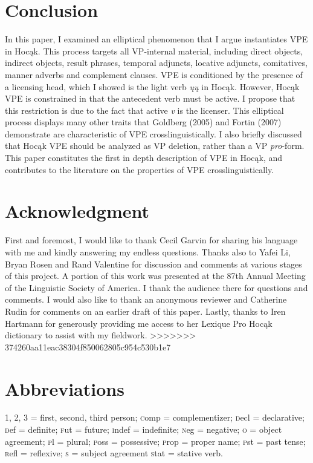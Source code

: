 \documentclass[output=paper]{LSP/langsci}
\begin{document}
\section{Conclusion}

In this paper, I examined an elliptical phenomenon that I argue instantiates VPE in Hoc\k{a}k. This process targets all VP-internal material, including direct objects, indirect objects, result phrases, temporal adjuncts, locative adjuncts, comitatives, manner adverbs and complement clauses. VPE is conditioned by the presence of a licensing head, which I showed is the light verb \emph{\k{u}\k{u}} in Hoc\k{a}k. However, Hoc\k{a}k VPE is constrained in that the antecedent verb must be active. I propose that this restriction is due to the fact that active \emph{v} is the licenser. This elliptical process displays many other traits that Goldberg (2005) and Fortin (2007) demonstrate are characteristic of VPE crosslinguistically. I also briefly discussed that Hoc\k{a}k VPE should be analyzed as VP deletion, rather than a VP \emph{pro}-form. This paper constitutes the first in depth description of VPE in Hoc\k{a}k, and contributes to the literature on the properties of VPE crosslinguistically. 

\section*{Acknowledgment}

First and foremost, I would like to thank Cecil Garvin for sharing his language with me and kindly answering my endless questions. Thanks also to Yafei Li, Bryan Rosen and Rand Valentine for discussion and comments at various stages of this project. A portion of this work was presented at the 87th Annual Meeting of the Linguistic Society of America. I thank the audience there for questions and comments. I would also like to thank an anonymous reviewer and Catherine Rudin for comments on an earlier draft of this paper. Lastly, thanks to Iren Hartmann for generously providing me access to her Lexique Pro Hoc\k{a}k dictionary to assist with my fieldwork.
>>>>>>> 374260aa11eac38304f850062805c954c530b1e7

\section*{Abbreviations}
1, 2, 3 = first, second, third person; {\textsc comp} = complementizer; {\textsc decl} = declarative; {\textsc def} = definite; {\textsc fut} = future; {\textsc indef} = indefinite; {\textsc neg} = negative; {\textsc o} = object agreement; {\textsc pl} = plural; {\textsc poss} = possessive; {\textsc prop} = proper name; {\textsc pst} = past tense; {\textsc refl} = reflexive; {\textsc s} = subject agreement {\textsc stat} = stative verb.
\end{document}
